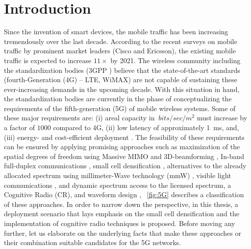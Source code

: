 \chapter{Introduction}
\label{chap:Int}

Since the invention of smart devices, the mobile traffic has been increasing tremendously over the last decade. According to the recent surveys on mobile traffic by prominent market leaders (Cisco \cite{CISCO14} and Ericsson\cite{Eric15}), the existing mobile traffic is expected to increase $11 \times$ by 2021. The wireless community including the standardization bodies (3GPP \cite{3GPP}) believe that the state-of-the-art standards (fourth-Generation (4G) -- LTE, WiMAX) are not capable of sustaining these ever-increasing demands in the upcoming decade. With this situation in hand, the standardization bodies are currently in the phase of conceptualizing the requirements of the fifth-generation (5G) of mobile wireless systems.
Some of these major requirements are: (i) areal capacity in $\SI{}{bits/sec/m^2}$ must increase by a factor of $1000$ compared to 4G, (ii) low latency of approximately \SI{1}{ms}, and, (iii) energy- and cost-efficient deployment \cite{Qual13, Andrews14}.
The feasibility of these requirements can be ensured by applying promising approaches such as maximization of the spatial degrees of freedom using Massive MIMO \cite{Lar14} and 3D-beamforming \cite{Hal13}, In-band full-duplex communications \cite{Sab14}, small cell densification \cite{Andrews12, Gel13}, alternatives to the already allocated spectrum using millimeter-Wave technology (mmW) \cite{Rapp13}, visible light communications \cite{Wu14}, and dynamic spectrum access to the licensed spectrum, a Cognitive Radio (CR), and waveform design \cite{Scha14, Baz15}, \figurename~\ref{fig:5G} describes a classification of these approaches. In order to narrow down the perspective, in this thesis, a deployment scenario that lays emphasis on the small cell densification and the implementation of cognitive radio techniques is proposed. Before moving any further, let us elaborate on the underlying facts that make these approaches or their combination suitable candidates for the 5G networks. 

